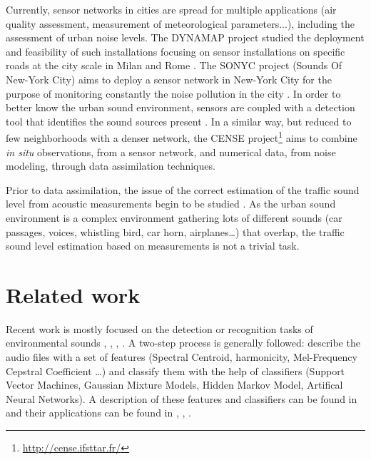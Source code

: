 \documentclass[twocolumn]{svjour3}          %
\begin{document}
Currently, sensor networks in cities are spread for multiple applications (air quality assessment, measurement of meteorological parameters...), including the assessment of urban noise levels. The DYNAMAP project \cite{dynamap_2016} studied the deployment and feasibility of such installations focusing on sensor installations on specific roads at the city scale in Milan and Rome \cite{bellucci_life_2017}.
The SONYC project (Sounds Of New-York City) aims to deploy a sensor network in New-York City for the purpose of monitoring constantly the noise pollution in the city \cite{mydlarz2017implementation}. In order to better know the urban sound environment, sensors are coupled with a detection tool that identifies the sound sources present \cite{salamon2017deep}. In a similar way, but reduced to few neighborhoods with a denser network, the CENSE project\footnote{\url{http://cense.ifsttar.fr/}} \cite{picaut2017characterization} aims to combine \textit{in situ} observations, from a sensor network, and numerical data, from noise modeling, through data assimilation techniques.

Prior to data assimilation, the issue of the correct estimation of the traffic sound level from acoustic measurements begin to be studied \cite{leiba2017large,socoro_anomalous_2017}. As the urban sound environment is a complex environment gathering lots of different sounds (car passages, voices, whistling bird, car horn, airplanes\dots) that overlap, the traffic sound level estimation based on measurements is not a trivial task.

\section{Related work}

Recent work is mostly focused on the detection or recognition tasks of environmental sounds \cite{heittola_sound_2011}, \cite{defreville_automatic_2006}, \cite{dufaux_automatic_2000}, \cite{chu_environmental_2009}. A two-step process is generally followed: describe the audio files with a set of features (Spectral Centroid, harmonicity, Mel-Frequency Cepstral Coefficient \dots) and classify them with the help of classifiers (Support Vector Machines, Gaussian Mixture Models, Hidden Markov Model, Artifical Neural Networks). A description of these features and classifiers can be found in \cite{cowling_comparison_2003} and their applications can be found in \cite{shen_environmental_2012}, \cite{beritelli_pattern_2008}, \cite{couvreur_automatic_2004}.
\end{document}

